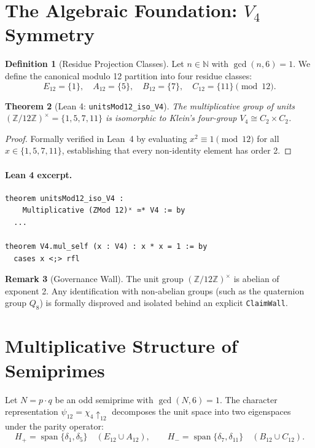 \documentclass[11pt,a4paper]{article}
\newtheorem{theorem}{Theorem}[section]
\theoremstyle{definition}
\newtheorem{definition}[theorem]{Definition}
\newtheorem{remark}[theorem]{Remark}
\begin{document}
	\section{The Algebraic Foundation: $V_4$ Symmetry}
	
	\begin{definition}[Residue Projection Classes]
		Let $n \in \mathbb{N}$ with $\gcd(n, 6) = 1$. We define the canonical modulo 12 partition into four residue classes:
		\[
		E_{12} = \{1\}, \quad A_{12} = \{5\}, \quad B_{12} = \{7\}, \quad C_{12} = \{11\} \pmod{12}.
		\]
	\end{definition}
	
	\begin{theorem}[Lean 4: \texttt{unitsMod12\_iso\_V4}]
		The multiplicative group of units $(\mathbb{Z}/12\mathbb{Z})^\times = \{1, 5, 7, 11\}$ is isomorphic to Klein's four-group $V_4 \cong C_2 \times C_2$.
	\end{theorem}
	\begin{proof}
		Formally verified in Lean~4 by evaluating $x^2 \equiv 1 \pmod{12}$ for all $x \in \{1, 5, 7, 11\}$, establishing that every non-identity element has order 2.
	\end{proof}

	\paragraph{Lean 4 excerpt.}
	\begin{lstlisting}[caption={Excerpt: $V_4$ isomorphism (Lean~4)}]
theorem unitsMod12_iso_V4 :
    Multiplicative (ZMod 12)ˣ ≃* V4 := by
  ...

theorem V4.mul_self (x : V4) : x * x = 1 := by
  cases x <;> rfl
	\end{lstlisting}
	
	\begin{remark}[Governance Wall]
		The unit group $(\mathbb{Z}/12\mathbb{Z})^\times$ is abelian of exponent 2. Any identification with non-abelian groups (such as the quaternion group $Q_8$) is formally disproved and isolated behind an explicit \texttt{ClaimWall}.
	\end{remark}
	
	\section{Multiplicative Structure of Semiprimes}
	
	Let $N = p \cdot q$ be an odd semiprime with $\gcd(N, 6) = 1$. The character representation $\psi_{12} = \chi_4 \uparrow_{12}$ decomposes the unit space into two eigenspaces under the parity operator:
	\[
	H_+ = \operatorname{span}\{\delta_1, \delta_5\} \quad (E_{12} \cup A_{12}), \qquad H_- = \operatorname{span}\{\delta_7, \delta_{11}\} \quad (B_{12} \cup C_{12}).
	\]
	
\end{document}
